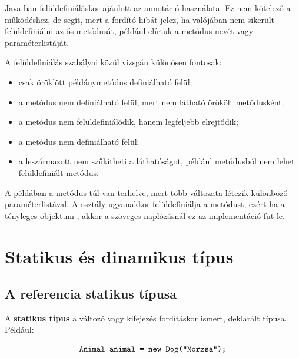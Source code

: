 Java-ban felüldefiniáláskor ajánlott az  annotáció használata. Ez nem kötelező a működéshez, de segít, mert a fordító hibát jelez, ha valójában nem sikerült felüldefiniálni az ős metódusát, például elírtuk a metódus nevét vagy paraméterlistáját.

A felüldefiniálás szabályai közül vizsgán különösen fontosak:

\begin{itemize}
  \item csak öröklött példánymetódus definiálható felül;
  \item a  metódus nem definiálható felül, mert nem látható örökölt metódusként;
  \item a  metódus nem felüldefiniálódik, hanem legfeljebb elrejtődik;
  \item a  metódus nem definiálható felül;
  \item a leszármazott nem szűkítheti a láthatóságot, például  metódusból nem lehet  felüldefiniált metódus.
\end{itemize}

\begin{center}

\end{center}


A példában a  metódus túl van terhelve, mert több változata létezik különböző paraméterlistával. A  osztály ugyanakkor felüldefiniálja a  metódust, ezért ha a tényleges objektum , akkor a szöveges naplózásnál ez az implementáció fut le.

\section{Statikus és dinamikus típus}

\subsection{A referencia statikus típusa}

A \textbf{statikus típus} a változó vagy kifejezés fordításkor ismert, deklarált típusa. Például:

\[
  \texttt{Animal animal = new Dog("Morzsa");}
\]

